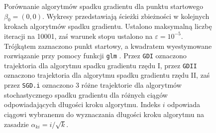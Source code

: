 \begin{figure}[hbt!]
  \caption[Porównanie algorytmów spadku gradientu dla punktu startowego $\beta_0 = (0,0)$.]{\label{fig:scasd}Porównanie algorytmów spadku gradientu dla punktu startowego $\beta_0 = (0,0)$. Wykresy przedstawiają ścieżki zbieżności w kolejnych krokach algorytmów spadku gradientu. Ustalono maksymalną liczbę iteracji na 10001, zaś warunek stopu ustalono na $\varepsilon=10^{-5}$. Trójkątem zaznaczono punkt startowy, a kwadratem wyestymowane rozwiązanie przy pomocy funkcji \texttt{glm} \cite{glmglm}. Przez \texttt{GDI} oznaczono trajektoria dla algorytmu spadku gradientu rzędu I, przez \texttt{GDII} oznaczono trajektoria dla algorytmu spadku gradientu rzędu II, zaś przez \texttt{SGD.i} oznaczono 3 różne trajektorie dla algorytmów stochastycznego spadku gradientu dla różnych ciągów odpowiadających długości kroku algorytmu. Indeks $i$ odpowiada ciągowi wybranemu do wyznaczania długości kroku algorytmu na zasadzie $\alpha_{ki} = i/\sqrt{k}$.}
\end{figure}


